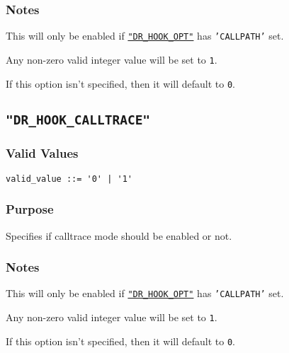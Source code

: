 \vspace{-2ex}
\subsubsection{Notes}
\vspace{-2ex}
This will only be enabled if \hyperref[section:flags:DR_HOOK_OPT]{\texttt{"DR\_HOOK\_OPT"}} has \texttt{'CALLPATH'} set.

Any non-zero valid integer value will be set to \verb|1|.

If this option isn't specified, then it will default to \verb|0|.



\subsection{\texttt{"DR\_HOOK\_CALLTRACE"}}
\label{section:flags:DR_HOOK_CALLTRACE}
\vspace{-2ex}
\subsubsection{Valid Values}
\vspace{-2ex}
\verb+valid_value ::= '0' | '1' +\\

\vspace{-2ex}
\subsubsection{Purpose}
\vspace{-2ex}
Specifies if calltrace mode should be enabled or not.

\vspace{-2ex}
\subsubsection{Notes}
\vspace{-2ex}
This will only be enabled if \hyperref[section:flags:DR_HOOK_OPT]{\texttt{"DR\_HOOK\_OPT"}} has \texttt{'CALLPATH'} set.


Any non-zero valid integer value will be set to \verb|1|.

If this option isn't specified, then it will default to \verb|0|.


